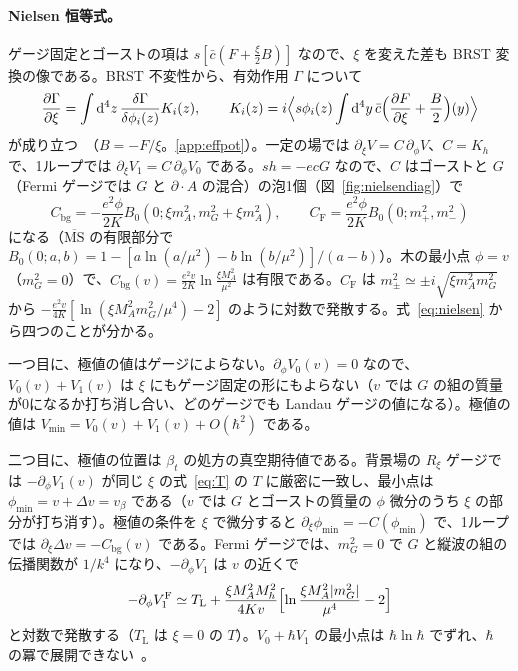 \documentclass[a4paper,10pt]{ltjsarticle}
\newcommand{\dd}{\mathrm{d}}
\newcommand{\MSbar}{\overline{\mathrm{MS}}}
\begin{document}
\paragraph{Nielsen 恒等式。}ゲージ固定とゴーストの項は $s[\bar c(F+\frac\xi2B)]$ なので、$\xi$ を変えた差も BRST 変換の像である。BRST 不変性から、有効作用 $\Gamma$ について
\begin{equation}
\frac{\partial\Gamma}{\partial\xi}=\int\dd^4z\,\frac{\delta\Gamma}{\delta\phi_i(z)}K_i(z),\qquad
K_i(z)=i\Bigl\langle s\phi_i(z)\int\dd^4y\,\bar c\Bigl(\frac{\partial F}{\partial\xi}+\frac B2\Bigr)(y)\Bigr\rangle
\label{eq:nielsen}
\end{equation}
が成り立つ~\cite{nielsen75}（$B=-F/\xi$。\ref{app:effpot}）。一定の場では $\partial_\xi V=C\,\partial_\phi V$、$C=K_h$ で、1ループでは $\partial_\xi V_1=C\,\partial_\phi V_0$ である。$sh=-ecG$ なので、$C$ はゴーストと $G$（Fermi ゲージでは $G$ と $\partial\!\cdot\!A$ の混合）の泡1個（図~\ref{fig:nielsendiag}）で
\begin{equation}
C_{\mathrm{bg}}=-\frac{e^2\phi}{2K}B_0(0;\xi m_A^2,m_G^2+\xi m_A^2),\qquad
C_{\mathrm F}=\frac{e^2\phi}{2K}B_0(0;m_+^2,m_-^2)
\label{eq:C}
\end{equation}
になる（$\MSbar$ の有限部分で $B_0(0;a,b)=1-[a\ln(a/\mu^2)-b\ln(b/\mu^2)]/(a-b)$）。木の最小点 $\phi=v$（$m_G^2=0$）で、$C_{\mathrm{bg}}(v)=\frac{e^2v}{2K}\ln\frac{\xi M_A^2}{\mu^2}$ は有限である。$C_{\mathrm F}$ は $m_\pm^2\simeq\pm i\sqrt{\xi m_A^2m_G^2}$ から $-\frac{e^2v}{4K}[\ln(\xi M_A^2m_G^2/\mu^4)-2]$ のように対数で発散する。式~\eqref{eq:nielsen} から四つのことが分かる。

一つ目に、極値の値はゲージによらない。$\partial_\phi V_0(v)=0$ なので、$V_0(v)+V_1(v)$ は $\xi$ にもゲージ固定の形にもよらない（$v$ では $G$ の組の質量が0になるか打ち消し合い、どのゲージでも Landau ゲージの値になる）。極値の値は $V_{\min}=V_0(v)+V_1(v)+O(\hbar^2)$ である。

二つ目に、極値の位置は $\beta_t$ の処方の真空期待値である。背景場の $R_\xi$ ゲージでは $-\partial_\phi V_1(v)$ が同じ $\xi$ の式~\eqref{eq:T} の $T$ に厳密に一致し、最小点は $\phi_{\min}=v+\Delta v=v_\beta$ である（$v$ では $G$ とゴーストの質量の $\phi$ 微分のうち $\xi$ の部分が打ち消す）。極値の条件を $\xi$ で微分すると $\partial_\xi\phi_{\min}=-C(\phi_{\min})$ で、1ループでは $\partial_\xi\Delta v=-C_{\mathrm{bg}}(v)$ である。Fermi ゲージでは、$m_G^2=0$ で $G$ と縦波の組の伝播関数が $1/k^4$ になり、$-\partial_\phi V_1$ は $v$ の近くで
\begin{equation}
-\partial_\phi V_1^{\mathrm F}\simeq T_{\mathrm L}+\frac{\xi M_A^2M_h^2}{4Kv}\Bigl[\ln\frac{\xi M_A^2|m_G^2|}{\mu^4}-2\Bigr]
\label{eq:Tfermi}
\end{equation}
と対数で発散する（$T_{\mathrm L}$ は $\xi=0$ の $T$）。$V_0+\hbar V_1$ の最小点は $\hbar\ln\hbar$ でずれ、$\hbar$ の冪で展開できない~\cite{afs15,egk16}。
\end{document}
